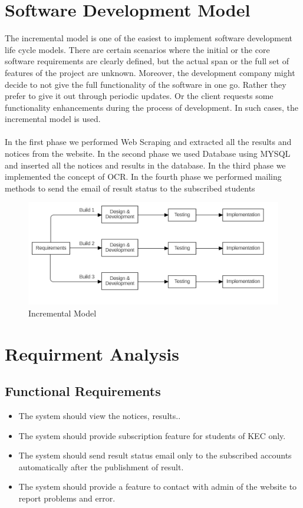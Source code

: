 \section{Software Development Model}
The incremental model is one of the easiest to implement software development life 
cycle models. There are certain scenarios where the initial or the core software 
requirements are clearly defined, but the actual span or the full set of features of the 
project are unknown. Moreover, the development company might decide to not give 
the full functionality of the software in one go. Rather they prefer to give it out through 
periodic updates. Or the client requests some functionality enhancements during the 
process of development. In such cases, the incremental model is used.
\\
\\
In the first phase we performed Web Scraping and extracted all the results and notices 
from the website. In the second phase we used Database using MYSQL and inserted all 
the notices and results in the database. In the third phase we implemented the concept 
of OCR. In the fourth phase we performed mailing methods to send the email of result 
status to the subscribed students
\begin{figure}[h]
    \centering
    \includegraphics[scale=0.5]{images/incremental.jpg}
    \caption{Incremental Model}
    \label{fig:my_label}
\end{figure}
\section{Requirment Analysis}
\subsection{Functional Requirements}
\begin{itemize}
	\item The system should view the notices, results..
	\item The system should provide subscription feature for students of KEC only.
	\item The system should send result status email only to the subscribed accounts 
automatically after the publishment of result.
	\item The system should provide a feature to contact with admin of the website to 
report problems and error.

\end{itemize}

